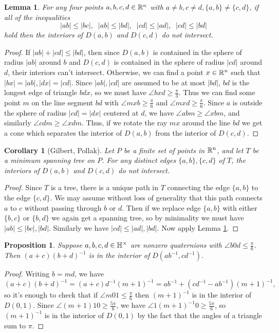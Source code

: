 \documentclass[letterpaper,11pt]{article}
\newtheorem{lem}{Lemma}
\newtheorem{cor}{Corollary}
\newtheorem{prop}{Proposition}
\theoremstyle{definition}
\theoremstyle{remark}
\begin{document}
\begin{lem}\label{geo} For any four points $a,b,c,d\in \mathbb{R}^n$ with $a\ne b, c\ne d, \{a,b\}\ne \{c,d\}$, if all of the inequalities
\[
|ab| \le |bc|,\;\; |ab| \le |bd|,\;\; |cd| \le |ad|,\;\; |cd| \le |bd|
\]
hold then the interiors of $D(a,b)$ and $D(c,d)$ do not intersect.
\end{lem}
\begin{proof} If $|ab|+|cd| \le |bd|$, then since $D(a,b)$ is contained in the sphere of radius $|ab|$ around $b$ and $D(c,d)$ is contained in the sphere of radius $|cd|$ around $d$, their interiors can't intersect. Otherwise, we can find a point $x\in \mathbb{R}^n$ such that $|bx| = |ab|, |dx| = |cd|$. Since $|ab|, |cd|$ are assumed to be at most $|bd|$, $bd$ is the longest edge of triangle $bdx$, so we must have $\angle bxd \ge \frac{\pi}{3}$. Thus we can find some point $m$ on the line segment $bd$ with $\angle mxb \ge \frac{\pi}{6}$ and $\angle mxd \ge \frac{\pi}{6}$. Since $a$ is outside the sphere of radius $|cd| = |dx|$ centered at $d$, we have $\angle abm \ge \angle xbm$, and similarly $\angle cdm \ge \angle xdm$. Thus, if we rotate the ray $mx$ around the line $bd$ we get a cone which separates the interior of $D(a,b)$ from the interior of $D(c,d)$.
\end{proof}

\begin{cor}[Gilbert, Pollak]\label{tree} Let $P$ be a finite set of points in $\mathbb{R}^n$, and let $T$ be a minimum spanning tree on $P$. For any distinct edges $\{a,b\},\{c,d\}$ of $T$, the interiors of $D(a,b)$ and $D(c,d)$ do not intersect.
\end{cor}
\begin{proof} Since $T$ is a tree, there is a unique path in $T$ connecting the edge $\{a,b\}$ to the edge $\{c,d\}$. We may assume without loss of generality that this path connects $a$ to $c$ without passing through $b$ or $d$. Then if we replace edge $\{a,b\}$ with either $\{b,c\}$ or $\{b,d\}$ we again get a spanning tree, so by minimality we must have $|ab| \le |bc|, |bd|$. Similarly we have $|cd| \le |ad|, |bd|$. Now apply Lemma \ref{geo}.
\end{proof}

\begin{prop}\label{diamond} Suppose $a,b,c,d \in \mathbb{H}^\times$ are nonzero quaternions with $\angle b0d \le \frac{\pi}{6}$. Then $(a+c)(b+d)^{-1}$ is in the interior of $D(ab^{-1},cd^{-1})$.
\end{prop}
\begin{proof} Writing $b=md$, we have
\[
(a+c)(b+d)^{-1} = (a+c)d^{-1}(m+1)^{-1} = ab^{-1} + (cd^{-1}-ab^{-1})(m+1)^{-1},
\]
so it's enough to check that if $\angle m01 \le \frac{\pi}{6}$ then $(m+1)^{-1}$ is in the interior of $D(0,1)$. Since $\angle (m+1)10 \ge \frac{5\pi}{6}$, we have $\angle 1(m+1)^{-1}0 \ge \frac{5\pi}{6}$, so $(m+1)^{-1}$ is in the interior of $D(0,1)$ by the fact that the angles of a triangle sum to $\pi$.
\end{proof}
\end{document}
